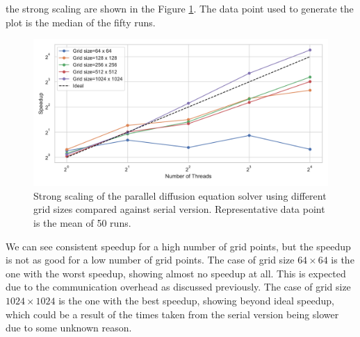 \documentclass[unicode,11pt,a4paper,oneside,numbers=endperiod,openany]{scrartcl}
\begin{document}
the strong scaling are shown in the Figure \ref{fig:strong}. The data point used
to generate the plot is the median of the fifty runs.
\begin{figure}[h!]
    \centering
    \includegraphics[width=\textwidth]{../mini_app/strong_scaling_plot.pdf}
    \caption{Strong scaling of the parallel diffusion equation solver using different grid sizes compared against serial version. Representative data point is the mean of 50 runs.}
    \label{fig:strong}
\end{figure}
We can see consistent speedup for a high number of grid points, but the speedup
is not as good for a low number of grid points. 
The case of grid size $64 \times 64$ is the one with the worst speedup, showing almost no speedup at all.
This is expected due to the communication overhead as discussed previously. 
The case of grid size $1024
\times 1024$ is the one with the best speedup, showing beyond ideal speedup,
which could be a result of the times taken from the serial version being slower
due to some unknown reason. 
\end{document}
